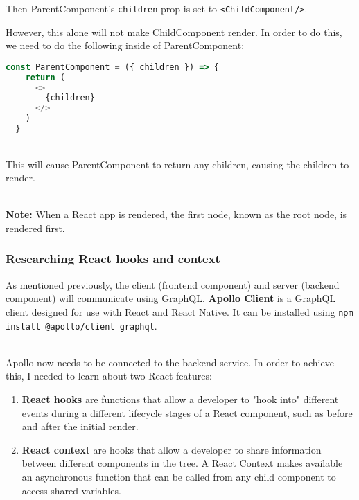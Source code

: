 \documentclass[../../main.tex]{subfiles}
\begin{document}
\noindent Then ParentComponent's \lstinline{children} prop is set to
\lstinline{<ChildComponent/>}.

\noindent However, this alone will not make ChildComponent render. In order to do this,
we need to do the following inside of ParentComponent:

\begin{lstlisting}[language=typescript]
  const ParentComponent = ({ children }) => {
    return (
      <>
        {children}
      </>
    )
  }
\end{lstlisting}

\noindent \\ This will cause ParentComponent to return any children,
causing the children to render.

\noindent \\ \textbf{Note:} When a React app is rendered, the first node,
known as the root node, is rendered first.


\subsubsection{Researching React hooks and context}


As mentioned previously, the client (frontend component) and server (backend component)
will communicate using GraphQL. \textbf{Apollo Client} is a GraphQL client designed for use with
React and React Native. It can be installed using
\lstinline[language=bash]{npm install @apollo/client graphql}.



\noindent \\ Apollo now needs to be connected to the backend service.
In order to achieve this, I needed to learn about two React features:

\begin{enumerate}
  \item \textbf{React hooks} are functions that allow a developer
        to "hook into" different events during a different lifecycle stages
        of a React component, such as before and after the initial render.

  \item \textbf{React context} are hooks that allow a developer
        to share information between different components in the tree.
        A React Context makes available an asynchronous function that
        can be called from any child component to access shared variables.
\end{enumerate}
\end{document}

